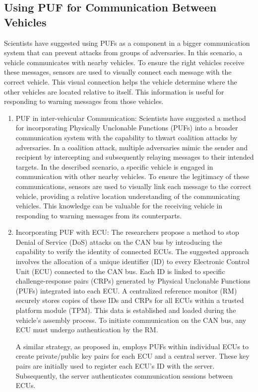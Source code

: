\documentclass[conference]{IEEEtran}
\begin{document}
\subsection{ Using PUF for Communication Between Vehicles }
Scientists have suggested using PUFs as a component in a bigger communication system that can prevent attacks from groups of adversaries. \cite{dolev2015optical}
In this scenario, a vehicle communicates with nearby vehicles. To ensure the right vehicles receive these messages, sensors are used to visually connect each message with the correct vehicle. This visual connection helps the vehicle determine where the other vehicles are located relative to itself. This information is useful for responding to warning messages from those vehicles.\par

\begin{enumerate}
    \item PUF in inter-vehicular Communication:
Scientists have suggested a method for incorporating Physically Unclonable Functions (PUFs) into a broader communication system with the capability to thwart coalition attacks by adversaries.\cite{dolev2015optical}
In a coalition attack, multiple adversaries mimic the sender and recipient by intercepting and subsequently relaying messages to their intended targets. In the described scenario, a specific vehicle is engaged in communication with other nearby vehicles. To ensure the legitimacy of these communications, sensors are used to visually link each message to the correct vehicle, providing a relative location understanding of the communicating vehicles. This knowledge can be valuable for the receiving vehicle in responding to warning messages from its counterparts.\par
    \item Incorporating PUF with ECU:
The researchers propose a method to stop Denial of Service (DoS) attacks on the CAN bus by introducing the capability to verify the identity of connected ECUs.\cite{aishwarya2016authentication}
The suggested approach involves the allocation of a unique identifier (ID) to every Electronic Control Unit (ECU) connected to the CAN bus. Each ID is linked to specific challenge-response pairs (CRPs) generated by Physical Unclonable Functions (PUFs) integrated into each ECU. A centralized reference monitor (RM) securely stores copies of these IDs and CRPs for all ECUs within a trusted platform module (TPM). This data is established and loaded during the vehicle's assembly process. To initiate communication on the CAN bus, any ECU must undergo authentication by the RM.

A similar strategy, as proposed in, employs PUFs within individual ECUs to create private/public key pairs for each ECU and a central server.\cite{han2018bad} These key pairs are initially used to register each ECU's ID with the server. Subsequently, the server authenticates communication sessions between ECUs.\cite{labrado2019hardware1}

\end{enumerate}
\end{document}
